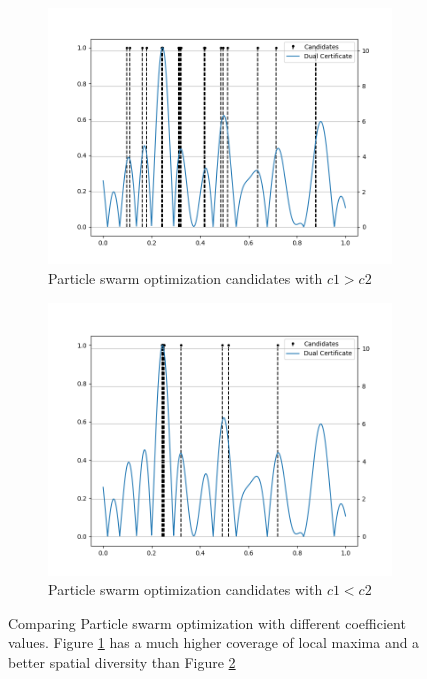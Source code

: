 \documentclass[a4paper,12pt,oneside]{report}
\theoremstyle{named}
\begin{document}
\begin{figure}
\centering
\begin{subfigure}[b]{0.8\textwidth}
   \includegraphics[width=1\linewidth]{swarm.png}
   \caption{Particle swarm optimization candidates with $c1 > c2$}
   \label{fig:swarm} 
\end{subfigure}

\begin{subfigure}[b]{0.8\textwidth}
   \includegraphics[width=1\linewidth]{swarm2.png}
   \caption{Particle swarm optimization candidates with $c1 < c2$}
   \label{fig:swarm2} 
\end{subfigure}

\caption{Comparing Particle swarm optimization with different coefficient values. Figure \ref{fig:swarm} has a much higher coverage of local maxima and a better spatial diversity than Figure \ref{fig:swarm2}}
\label{fig:swarmvs}
\end{figure}
\end{document}

